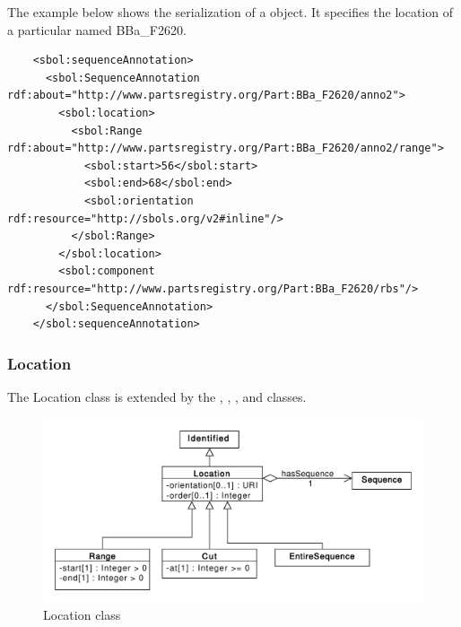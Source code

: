 The example below shows the serialization of a  object. It specifies the location of a particular  named BBa\_F2620.
\begin{lstlisting}
    <sbol:sequenceAnnotation>
      <sbol:SequenceAnnotation rdf:about="http://www.partsregistry.org/Part:BBa_F2620/anno2">
        <sbol:location>
          <sbol:Range rdf:about="http://www.partsregistry.org/Part:BBa_F2620/anno2/range">
            <sbol:start>56</sbol:start>
            <sbol:end>68</sbol:end>
            <sbol:orientation rdf:resource="http://sbols.org/v2#inline"/>
          </sbol:Range>
        </sbol:location>
        <sbol:component rdf:resource="http://www.partsregistry.org/Part:BBa_F2620/rbs"/>
      </sbol:SequenceAnnotation>
    </sbol:sequenceAnnotation>
\end{lstlisting}





\subsubsection{Location}
\label{sec:Location}
The Location class is extended by the , , , and  classes.


\begin{figure}[ht]
\begin{center}
\includegraphics[scale=0.6]{uml/location}
\caption[]{Location class}
\label{uml:location}
\end{center}
\end{figure}

